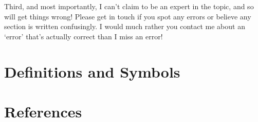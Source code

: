 \documentclass[a4paper,11pt,twoside]{report}
\begin{document}
\begin{sloppypar}
Third, and most importantly, I can't claim to be an expert in the topic, and so will get things wrong! Please get in touch if you spot any errors or believe any section is written confusingly. I would much rather you contact me about an `error' that's actually correct than I miss an error!













\chapter*{Definitions and Symbols}

\chapter*{References}

\printbibliography[heading=none]

\end{sloppypar}
\end{document}
